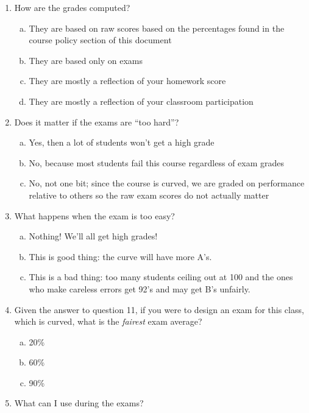 \documentclass[12pt]{article}
\newcommand{\qu}[1]{``#1''}
\begin{document}
\begin{enumerate}[1.]
\item How are the grades computed?

\begin{enumerate}[(a)]
\item They are based on raw scores based on the percentages found in the course policy section of this document
\item They are based only on exams
\item They are mostly a reflection of your homework score
\item They are mostly a reflection of your classroom participation
\end{enumerate}


\item Does it matter if the exams are \qu{too hard}?

\begin{enumerate}[(a)]
\item Yes, then a lot of students won't get a high grade
\item No, because most students fail this course regardless of exam grades
\item No, not one bit; since the course is curved, we are graded on performance relative to others so the raw exam scores do not actually matter
\end{enumerate}

\item What happens when the exam is too easy? 

\begin{enumerate}[(a)]
\item Nothing! We'll all get high grades!
\item This is good thing: the curve will have more A's.
\item This is a bad thing: too many students ceiling out at 100 and the ones who make careless errors get 92's and may get B's unfairly.
\end{enumerate}

\item Given the answer to question 11, if you were to design an exam for this class, which is curved, what is the \textit{fairest} exam average?

\begin{enumerate}[(a)]
\item 20\%
\item 60\%
\item 90\%
\end{enumerate}

\item What can I use during the exams?


\end{enumerate}
\end{document}
